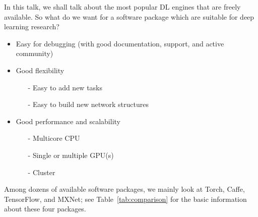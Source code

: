 \documentclass[11pt, oneside]{article}   	%
\begin{document}
In this talk, we shall talk about the most popular DL engines that are freely available. So what do we want for a software package which are suitable for deep learning research?
\begin{itemize}
\item Easy for debugging (with good {documentation}, {support}, and active community)
\item Good flexibility
	\begin{itemize}
	\item[-] Easy to add new tasks
	\item[-] Easy to build new network structures
	\end{itemize}
\item Good performance and scalability
	\begin{itemize}
	\item[-] Multicore CPU
	\item[-] {Single} or {multiple} GPU(s)
	\item[-] Cluster
	\end{itemize}
\end{itemize}
%
Among dozens of available software packages, we mainly look at Torch, Caffe, TensorFlow, and MXNet; see Table~\ref{tab:comparison} for the basic information about these four packages. 
%
\renewcommand{\multirowsetup}{\centering} 
\end{document}
